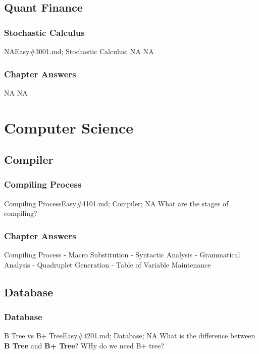 \documentclass[oldfontcommands]{memoir}
\begin{document}
{\chapter{Quant Finance}
\minitoc
\section{Stochastic Calculus}
\begin{question}{NA}{Easy}{\#3001.md; Stochastic Calculus; NA}
NA

\end{question}

\newpage\section{Chapter Answers}\begin{answer}{NA}
NA
\end{answer}
\part{Computer Science}
\chapter{Compiler}
\minitoc
\section{Compiling Process}
\begin{question}{Compiling Process}{Easy}{\#4101.md; Compiler; NA}
What are the stages of compiling?

\end{question}

\newpage\section{Chapter Answers}\begin{answer}{Compiling Process}
- Macro Substitution
- Syntactic Analysis
- Grammatical Analysis
- Quadruplet Generation
- Table of Variable Maintenance\end{answer}
\chapter{Database}
\minitoc
\section{Database}
\begin{question}{B Tree vs B+ Tree}{Easy}{\#4201.md; Database; NA}
What is the difference between {\bf{B Tree}} and {\bf{B+ Tree}}? WHy do we need B+ tree?


\end{question}}
\end{document}
